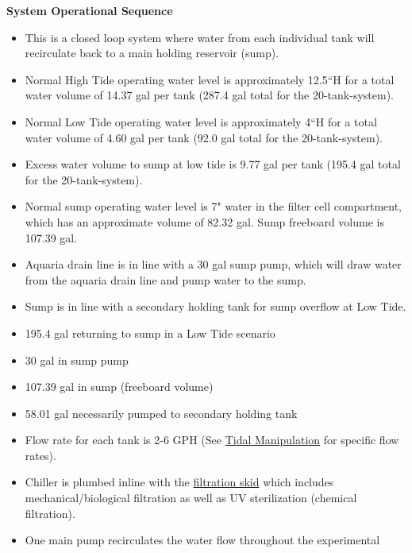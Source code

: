 \documentclass[]{book}
\providecommand{\tightlist}{%
  \setlength{\itemsep}{0pt}\setlength{\parskip}{0pt}}
\begin{document}
 \textbf{System Operational Sequence}

\begin{itemize}
\tightlist
\item
  This is a closed loop system where water from each individual tank
  will recirculate back to a main holding reservoir (sump).\\
\item
  Normal High Tide operating water level is approximately 12.5``H for a
  total water volume of 14.37 gal per tank (287.4 gal total for the
  20-tank-system).\\
\item
  Normal Low Tide operating water level is approximately 4``H for a
  total water volume of 4.60 gal per tank (92.0 gal total for the
  20-tank-system).\\
\item
  Excess water volume to sump at low tide is 9.77 gal per tank (195.4
  gal total for the 20-tank-system).\\
\item
  Normal sump operating water level is 7" water in the filter cell
  compartment, which has an approximate volume of 82.32 gal. Sump
  freeboard volume is 107.39 gal.\\
\item
  Aquaria drain line is in line with a 30 gal sump pump, which will draw
  water from the aquaria drain line and pump water to the sump.
\item
  Sump is in line with a secondary holding tank for sump overflow at Low
  Tide.
\item
  195.4 gal returning to sump in a Low Tide scenario
\item
  30 gal in sump pump
\item
  107.39 gal in sump (freeboard volume)
\item
  58.01 gal necessarily pumped to secondary holding tank
\item
  Flow rate for each tank is 2-6 GPH (See
  \href{chapters/06-tidal_manipulation.md}{Tidal Manipulation} for
  specific flow rates).\\
\item
  Chiller is plumbed inline with the
  \href{https://github.com/SilbigerLab/Mesocosm_User_Manual/blob/master/Manuals/Filtration_Skid_Build_Package.pdf}{filtration
  skid} which includes mechanical/biological filtration as well as UV
  sterilization (chemical filtration).\\
\item
  One main pump recirculates the water flow throughout the experimental

\end{itemize}
\end{document}
